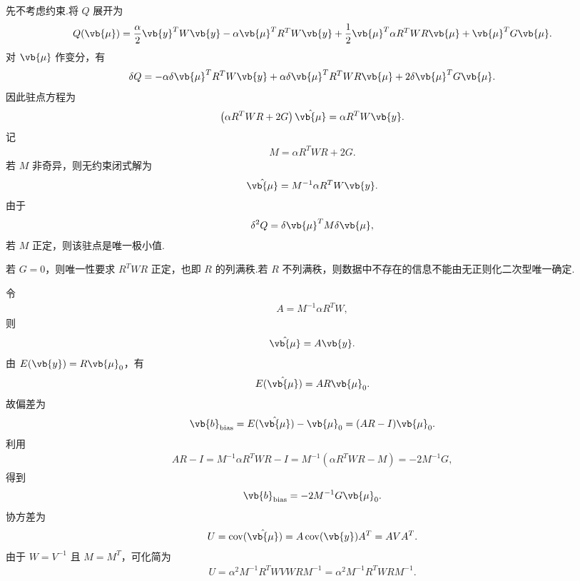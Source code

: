 先不考虑约束.将 \(Q\) 展开为
\begin{align*}
	Q(\vb{\mu})
	=\frac{\alpha}{2}\vb{y}^TW\vb{y}
	-\alpha\vb{\mu}^TR^TW\vb{y}
	+\frac{1}{2}\vb{\mu}^T\alpha R^TWR\vb{\mu}
	+\vb{\mu}^TG\vb{\mu}.
\end{align*}
对 \(\vb{\mu}\) 作变分，有
\begin{align*}
	\delta Q
	=-\alpha\delta\vb{\mu}^TR^TW\vb{y}
	+\alpha\delta\vb{\mu}^TR^TWR\vb{\mu}
	+2\delta\vb{\mu}^TG\vb{\mu}.
\end{align*}
因此驻点方程为
\begin{align*}
	\left(\alpha R^TWR+2G\right)\hat{\vb{\mu}}
	=\alpha R^TW\vb{y}.
\end{align*}
记
\begin{align*}
	M=\alpha R^TWR+2G.
\end{align*}
若 \(M\) 非奇异，则无约束闭式解为
\begin{align*}
	\hat{\vb{\mu}}
	=M^{-1}\alpha R^TW\vb{y}.
\end{align*}
由于
\begin{align*}
	\delta^2Q
	=\delta\vb{\mu}^TM\delta\vb{\mu},
\end{align*}
若 \(M\) 正定，则该驻点是唯一极小值.

\begin{note}
	若 \(G=0\)，则唯一性要求 \(R^TWR\) 正定，也即 \(R\) 的列满秩.若 \(R\) 不列满秩，则数据中不存在的信息不能由无正则化二次型唯一确定.
\end{note}

令
\begin{align*}
	A=M^{-1}\alpha R^TW,
\end{align*}
则
\begin{align*}
	\hat{\vb{\mu}}=A\vb{y}.
\end{align*}
由 \(E(\vb{y})=R\vb{\mu}_0\)，有
\begin{align*}
	E(\hat{\vb{\mu}})
	=AR\vb{\mu}_0.
\end{align*}
故偏差为
\begin{align*}
	\vb{b}_{\rm bias}
	=E(\hat{\vb{\mu}})-\vb{\mu}_0
	=(AR-I)\vb{\mu}_0.
\end{align*}
利用
\begin{align*}
	AR-I
	=M^{-1}\alpha R^TWR-I
	=M^{-1}\left(\alpha R^TWR-M\right)
	=-2M^{-1}G,
\end{align*}
得到
\begin{align*}
	\vb{b}_{\rm bias}
	=-2M^{-1}G\vb{\mu}_0.
\end{align*}
协方差为
\begin{align*}
	U
	=\operatorname{cov}(\hat{\vb{\mu}})
	=A\operatorname{cov}(\vb{y})A^T
	=AVA^T.
\end{align*}
由于 \(W=V^{-1}\) 且 \(M=M^T\)，可化简为
\begin{align*}
	U
	=\alpha^2M^{-1}R^TWVWRM^{-1}
	=\alpha^2M^{-1}R^TWRM^{-1}.
\end{align*}

